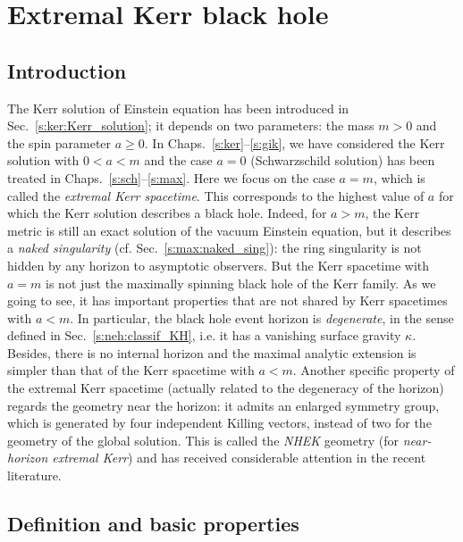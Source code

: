 \chapter{Extremal Kerr black hole}
\label{s:exk}

\minitoc

\section{Introduction}

The Kerr solution of Einstein equation has been introduced in Sec.~\ref{s:ker:Kerr_solution};
it depends on two parameters: the mass $m > 0$ and the spin parameter
$a \geq 0$.
In Chaps.~\ref{s:ker}--\ref{s:gik}, we have considered the Kerr solution with $0<a<m$
and the case $a=0$ (Schwarzschild solution) has been treated in Chaps.~\ref{s:sch}--\ref{s:max}.
Here we focus on the case $a=m$, which is called the \emph{extremal Kerr spacetime}.
This corresponds to the highest value of $a$
for which the Kerr solution describes a black hole.
Indeed, for $a> m$, the Kerr metric is still an exact
solution of the vacuum Einstein equation, but it describes a \emph{naked singularity} (cf. Sec.~\ref{s:max:naked_sing}):
the ring singularity is not hidden by any horizon to asymptotic observers.
But the Kerr spacetime with $a=m$ is not just the maximally spinning black hole of the Kerr family.
As we going to see, it has important properties that are not
shared by Kerr spacetimes with $a<m$. In particular, the black hole event horizon is
\emph{degenerate}, in the sense defined in Sec.~\ref{s:neh:classif_KH}, i.e. it has a
vanishing surface gravity $\kappa$. Besides, there is no internal horizon
and the maximal analytic extension is simpler than
that of the Kerr spacetime with $a<m$.
Another specific property of the extremal Kerr spacetime (actually related
to the degeneracy of the horizon)
regards the geometry near the horizon: it admits an enlarged
symmetry group, which is generated
by four independent Killing vectors,
instead of two for the geometry of the global solution.
This is called the \emph{NHEK} geometry (for \emph{near-horizon extremal Kerr})
and has received considerable attention in the recent literature.



\section{Definition and basic properties}

